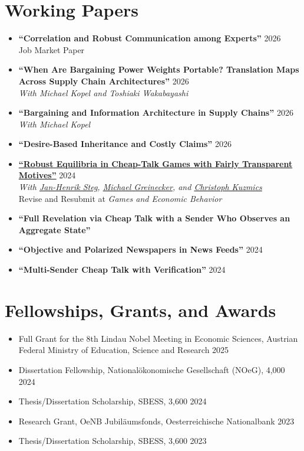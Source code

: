 \documentclass[11pt,letterpaper]{article}
\newcommand{\cvsection}[1]{%
  \Needspace{6\baselineskip}%
  \section*{#1}%
}
\begin{document}
\cvsection{Working Papers}
\begin{itemize}[label={}]
  \item \textbf{``Correlation and Robust Communication among Experts''} \hfill 2026\\
  Job Market Paper
  \item \textbf{``When Are Bargaining Power Weights Portable? Translation Maps Across Supply Chain Architectures''} \hfill 2026\\
  \textit{With Michael Kopel and Toshiaki Wakabayashi}
  \item \textbf{``Bargaining and Information Architecture in Supply Chains''} \hfill 2026\\
  \textit{With Michael Kopel}
  \item \textbf{``Desire-Based Inheritance and Costly Claims''} \hfill 2026
  \item \textbf{\href{https://arxiv.org/abs/2309.04193}{``Robust Equilibria in Cheap-Talk Games with Fairly Transparent Motives''}} \hfill 2024\\
  \textit{With \href{https://pub.uni-bielefeld.de/person/182054}{Jan-Henrik Steg}, \href{https://www.michaelgreinecker.com/}{Michael Greinecker}, and \href{https://sites.google.com/view/christoph-kuzmics}{Christoph Kuzmics}}\\
  Revise and Resubmit at \textit{Games and Economic Behavior}
  \item
  \begin{minipage}[t]{0.84\textwidth}
    \textbf{``Full Revelation via Cheap Talk with a Sender Who Observes an Aggregate State''}
  \end{minipage}%
  \hfill
  \begin{minipage}[t]{0.12\textwidth}
  \end{minipage}
  \item \textbf{``Objective and Polarized Newspapers in News Feeds''} \hfill 2024
  \item \textbf{``Multi-Sender Cheap Talk with Verification''} \hfill 2024
\end{itemize}

\cvsection{Fellowships, Grants, and Awards}
\begin{itemize}[label={}]
  \item Full Grant for the 8th Lindau Nobel Meeting in Economic Sciences, Austrian Federal Ministry of Education, Science and Research \hfill 2025
  \item Dissertation Fellowship, National\"okonomische Gesellschaft (NOeG), \texteuro{}4,000 \hfill 2024
  \item Thesis/Dissertation Scholarship, SBESS, \texteuro{}3,600 \hfill 2024
  \item Research Grant, OeNB Jubil\"aumsfonds, Oesterreichische Nationalbank \hfill 2023
  \item Thesis/Dissertation Scholarship, SBESS, \texteuro{}3,600 \hfill 2023
\end{itemize}
\end{document}
